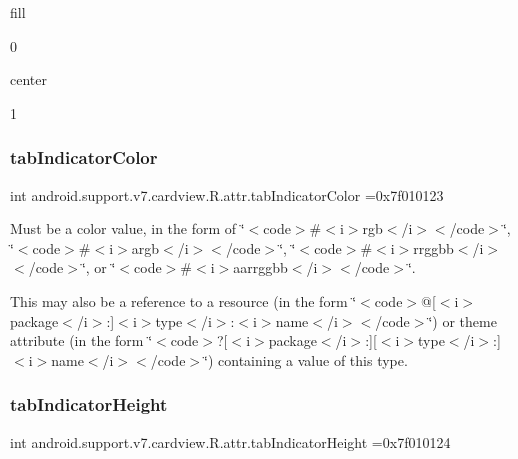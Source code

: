{\ttfamily fill}

0

{\ttfamily center}

1\mbox{\label{classandroid_1_1support_1_1v7_1_1cardview_1_1R_1_1attr_a127ad47732b6d288a076ced2aab96163}} 
\subsubsection{\texorpdfstring{tab\+Indicator\+Color}{tabIndicatorColor}}
{\footnotesize\ttfamily int android.\+support.\+v7.\+cardview.\+R.\+attr.\+tab\+Indicator\+Color =0x7f010123\hspace{0.3cm}{\ttfamily [static]}}

Must be a color value, in the form of \char`\"{}$<$code$>$\#$<$i$>$rgb$<$/i$>$$<$/code$>$\char`\"{}, \char`\"{}$<$code$>$\#$<$i$>$argb$<$/i$>$$<$/code$>$\char`\"{}, \char`\"{}$<$code$>$\#$<$i$>$rrggbb$<$/i$>$$<$/code$>$\char`\"{}, or \char`\"{}$<$code$>$\#$<$i$>$aarrggbb$<$/i$>$$<$/code$>$\char`\"{}. 

This may also be a reference to a resource (in the form \char`\"{}$<$code$>$@\mbox{[}$<$i$>$package$<$/i$>$\+:\mbox{]}$<$i$>$type$<$/i$>$\+:$<$i$>$name$<$/i$>$$<$/code$>$\char`\"{}) or theme attribute (in the form \char`\"{}$<$code$>$?\mbox{[}$<$i$>$package$<$/i$>$\+:\mbox{]}\mbox{[}$<$i$>$type$<$/i$>$\+:\mbox{]}$<$i$>$name$<$/i$>$$<$/code$>$\char`\"{}) containing a value of this type. \mbox{\label{classandroid_1_1support_1_1v7_1_1cardview_1_1R_1_1attr_a612178f5edffc144a50fc472aa0f2dfe}} 
\subsubsection{\texorpdfstring{tab\+Indicator\+Height}{tabIndicatorHeight}}
{\footnotesize\ttfamily int android.\+support.\+v7.\+cardview.\+R.\+attr.\+tab\+Indicator\+Height =0x7f010124\hspace{0.3cm}{\ttfamily [static]}}

